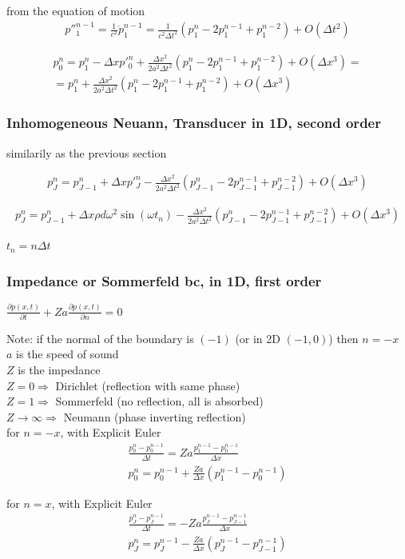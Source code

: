 \documentclass{article}
\newcommand{\pd}[2]{\frac{\partial #1}{\partial #2}}
\numberwithin{equation}{section}
\begin{document}
from the equation of motion
\begin{align}\label{eq:shift4}
	p''^{n-1}_{1} = \frac{1}{c^2}\ddot p^{n-1}_1 = \frac{1}{c^2\Delta t^2}\left( p^n_1-2p^{n-1}_1+p^{n-2}_1 \right) + O(\Delta t^2)
\end{align}

\begin{align}
	p^n_0 = p^n_1 - \Delta x p'^n_0 + \frac{\Delta x^2}{2 a^2\Delta t^2 } \left( p^n_1 - 2p^{n-1}_1 + p^{n-2}_1 \right) + O(\Delta x ^3) = \nonumber \\
	= p^n_1 + \frac{\Delta x^2}{2 a^2\Delta t^2 } \left( p^n_1 - 2p^{n-1}_1 + p^{n-2}_1 \right) + O(\Delta x ^3)
\end{align}

\subsubsection{Inhomogeneous Neuann, Transducer in 1D, second order}
similarily as the previous section

\begin{align}
	p^n_J = p^n_{J-1} + \Delta x p'^n_J - \frac{\Delta x^2}{2 a^2\Delta t^2 } \left( p^n_{J-1} - 2p^{n-1}_{J-1} + p^{n-2}_{J-1} \right) + O(\Delta x ^3)
\end{align}

\begin{align}
	p^n_J = p^n_{J-1} + \Delta x \rho d \omega^2 \sin \left( \omega t_n \right) - \frac{\Delta x^2}{2 a^2\Delta t^2 } \left( p^n_{J-1} - 2p^{n-1}_{J-1} + p^{n-2}_{J-1} \right) + O(\Delta x ^3)
\end{align}

$t_n = n\Delta t$

\subsubsection{Impedance or Sommerfeld bc, in 1D, first order}

$\pd{p(x,t)}{t}+Za\pd{p(x,t)}{n}=0$

Note: if the normal of the boundary is $(-1)$ (or in 2D $(-1,0)$) then $n = -x$\\
$a$ is the speed of sound\\
$Z$ is the impedance\\
$Z=0\Rightarrow$ Dirichlet (reflection with same phase)\\
$Z=1\Rightarrow$ Sommerfeld (no reflection, all is absorbed)\\
$Z\rightarrow\infty \Rightarrow$ Neumann (phase inverting reflection)\\
for $n = -x$, with Explicit Euler
\begin{align}
	\frac{p^n_0 - p^{n-1}_0}{\Delta t} = Za\frac{p^{n-1}_1 - p^{n-1}_0}{\Delta x}\\
	p^n_0 = p^{n-1}_0 + \frac{Z a }{\Delta x} \left( p^{n-1}_1 - p^{n-1}_0 \right)
\end{align}

for $n = x$, with Explicit Euler
\begin{align}
	\frac{p^n_J - p^{n-1}_J}{\Delta t} = - Za\frac{p^{n-1}_J - p^{n-1}_{J-1}}{\Delta x}\\
	p^n_J = p^{n-1}_J - \frac{Z a }{\Delta x} \left( p^{n-1}_J - p^{n-1}_{J-1} \right)
\end{align}
\end{document}
